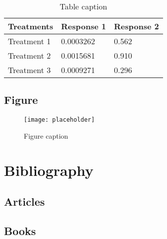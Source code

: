 \documentclass[11pt,fleqn]{book} %
\begin{document}
\begin{table}[h]
	\centering
	\begin{tabular}{l l l}
		\toprule
		\textbf{Treatments} & \textbf{Response 1} & \textbf{Response 2} \\
		\midrule
		Treatment 1         & 0.0003262           & 0.562               \\
		Treatment 2         & 0.0015681           & 0.910               \\
		Treatment 3         & 0.0009271           & 0.296               \\
		\bottomrule
	\end{tabular}
	\caption{Table caption}
\end{table}


\section{Figure}

\begin{figure}[h]
	\centering\texttt{[image: placeholder]}
	\caption{Figure caption}
\end{figure}


\chapter*{Bibliography}


\section*{Articles}
\printbibliography[heading=bibempty,type=article]


\section*{Books}
\printbibliography[heading=bibempty,type=book]


\cleardoublepage
{}
\setlength{\columnsep}{0.75cm}
\printindex

\end{document}
